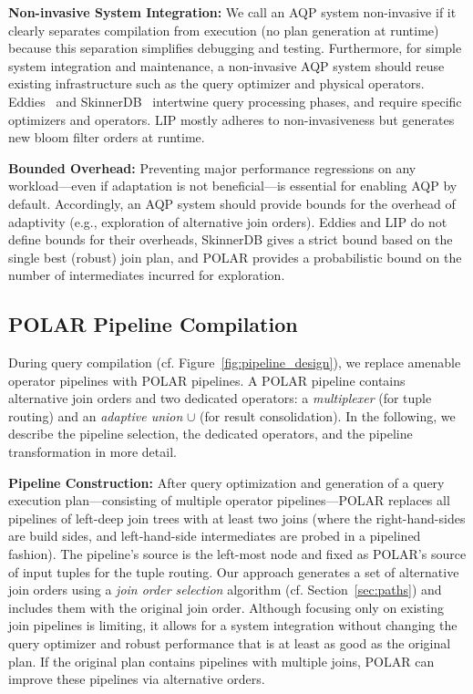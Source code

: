 \textbf{Non-invasive System Integration:} We call an AQP system non-invasive if it clearly separates compilation from execution (no plan generation at runtime) because this separation simplifies debugging and testing. Furthermore, for simple system integration and maintenance, a non-invasive AQP system should reuse existing infrastructure such as the query optimizer and physical operators. Eddies~\cite{HellersteinA00} and SkinnerDB~\cite{TrummerWMMJA19} intertwine query processing phases, and require specific optimizers and operators. LIP mostly adheres to non-invasiveness but generates new bloom filter orders at runtime.

\textbf{Bounded Overhead:} Preventing major performance regressions on any workload---even if adaptation is not beneficial---is essential for enabling AQP by default. Accordingly, an AQP system should provide bounds for the overhead of adaptivity (e.g., exploration of alternative join orders). Eddies and LIP do not define bounds for their overheads, SkinnerDB gives a strict bound based on the single best (robust) join plan, and POLAR provides a probabilistic bound on the number of intermediates incurred for exploration.

\vspace{-0.1cm}
\subsection{POLAR Pipeline Compilation}
\label{pipeline-enhancement}

During query compilation (cf. Figure~\ref{fig:pipeline_design}), we replace amenable operator pipelines with POLAR pipelines. A POLAR pipeline contains alternative join orders and two dedicated operators: a \textit{multiplexer} (for tuple routing) and an \textit{adaptive union} $\cup$ (for result consolidation). In the following, we describe the pipeline selection, the dedicated operators, and the pipeline transformation in more detail.

\textbf{Pipeline Construction:} After query optimization and generation of a query execution plan---consisting of multiple operator pipelines---POLAR replaces all pipelines of left-deep join trees with at least two joins (where the right-hand-sides are build sides, and left-hand-side intermediates are probed in a pipelined fashion). The pipeline's source is the left-most node and fixed as POLAR's source of input tuples for the tuple routing. Our approach generates a set of alternative join orders using a \emph{join order selection} algorithm (cf. Section~\ref{sec:paths}) and includes them with the original join order. Although focusing only on existing join pipelines is limiting, it allows for a system integration without changing the query optimizer and robust performance that is at least as good as the original plan. If the original plan contains pipelines with multiple joins, POLAR can improve these pipelines via alternative orders.

